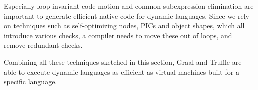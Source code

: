 Especially loop-invariant code motion and common subexpression elimination are important
to generate efficient native code for dynamic languages.
Since we rely on techniques such as self-optimizing nodes, PICs and object shapes,
which all introduce various checks,
a compiler needs to move these out of loops, and remove redundant checks.

Combining all these techniques sketched in this section,
Graal and Truffle are able to execute dynamic languages as efficient
as virtual machines built for a specific language.
